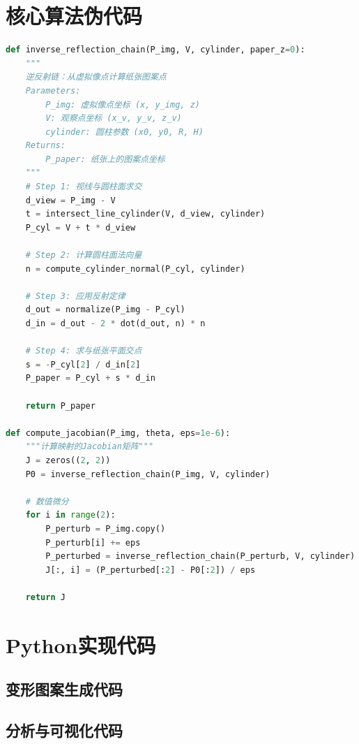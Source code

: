 \documentclass[withoutpreface]{cumcmthesis}
\begin{document}
\begin{appendices}
\section{核心算法伪代码}

\begin{lstlisting}[language=Python]
def inverse_reflection_chain(P_img, V, cylinder, paper_z=0):
    """
    逆反射链：从虚拟像点计算纸张图案点
    Parameters:
        P_img: 虚拟像点坐标 (x, y_img, z)
        V: 观察点坐标 (x_v, y_v, z_v)
        cylinder: 圆柱参数 (x0, y0, R, H)
    Returns:
        P_paper: 纸张上的图案点坐标
    """
    # Step 1: 视线与圆柱面求交
    d_view = P_img - V
    t = intersect_line_cylinder(V, d_view, cylinder)
    P_cyl = V + t * d_view
    
    # Step 2: 计算圆柱面法向量
    n = compute_cylinder_normal(P_cyl, cylinder)
    
    # Step 3: 应用反射定律
    d_out = normalize(P_img - P_cyl)
    d_in = d_out - 2 * dot(d_out, n) * n
    
    # Step 4: 求与纸张平面交点
    s = -P_cyl[2] / d_in[2]
    P_paper = P_cyl + s * d_in
    
    return P_paper

def compute_jacobian(P_img, theta, eps=1e-6):
    """计算映射的Jacobian矩阵"""
    J = zeros((2, 2))
    P0 = inverse_reflection_chain(P_img, V, cylinder)
    
    # 数值微分
    for i in range(2):
        P_perturb = P_img.copy()
        P_perturb[i] += eps
        P_perturbed = inverse_reflection_chain(P_perturb, V, cylinder)
        J[:, i] = (P_perturbed[:2] - P0[:2]) / eps
    
    return J
\end{lstlisting}

\section{Python实现代码}

\subsection{变形图案生成代码}



\subsection{分析与可视化代码}


\end{appendices}
\end{document}

